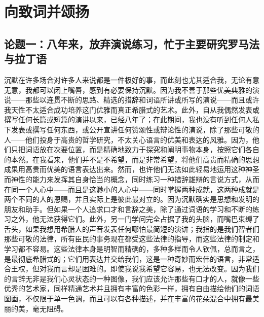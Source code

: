 
\chapter{向致词并颂扬}



\section{论题一：八年来，放弃演说练习，忙于主要研究罗马法与拉丁语}

沉默在许多场合对许多人来说都是一件极好的事，而此刻也尤其适合我，无论有意无意，我都可以闭上嘴唇，感到有必要保持沉默。因为我不善于那些优美典雅的演说——那些以连贯不断的思路、精选的措辞和词语所讲或所写的演说——而且或许我天性不太适合成功培养这门优雅而真正希腊式的艺术。此外，自从我偶然发表或撰写任何长篇或短篇的演讲以来，已经八年了；在此期间，我也没有听到任何人私下发表或撰写任何东西，或公开宣讲任何赞颂性或辩论性的演说，除了那些可敬的人——他们投身于高贵的哲学研究，不太关心语言的优美和表达的风雅。因为，他们只把词语放在次要位置，而是精确地致力于探究和阐明事物本身，按照它们各自的本然。在我看来，他们并不是不希望，而是非常希望，将他们高贵而精确的思想成果用高贵而优美的语言表达出来。然而，也许他们无法如此轻易地运用这种神圣而神性的能力来发挥其自身恰当的概念，同时练习一种措辞雄辩的言说方式，从而在同一个人心中——而且是这渺小的人心中——同时掌握两种成就，这两种成就是两个不同的人的恩赐，并且实际上是彼此最对立的。因为沉默确实是思想和发明的朋友和助手。但如果一个人追求口才和言辞之美，除了通过词语的学习和不断的练习之外，他无法获得它们。此外，另一门学问完全占据了我的头脑，而嘴巴束缚了舌头，如果我想用希腊人的声音发表任何哪怕最简短的演讲；我指的是我们智者们那些可敬的法律，所有臣民的事务现在都受这些法律的指导，而这些法律的制定和学习都不容易。这些法律本身是明智而精确的，多种多样而令人钦佩，总而言之，是最彻底希腊式的；它们用表达并交给我们，这是一种奇妙而宏伟的语言，非常适合王权，但对我而言却是困难的。即使我说我希望它容易，也无法改变。因为我们的言辞无非是我们心灵状态的一种图像，我们应该允许那些有口才的人，就像一些优秀的艺术家，同样精通艺术并且拥有丰富的色彩一样，拥有自由描绘他们的词语图画，不仅限于单一色调，而且可以有各种描述，并在丰富的花朵混合中拥有最美丽的美，毫无阻碍。\par

